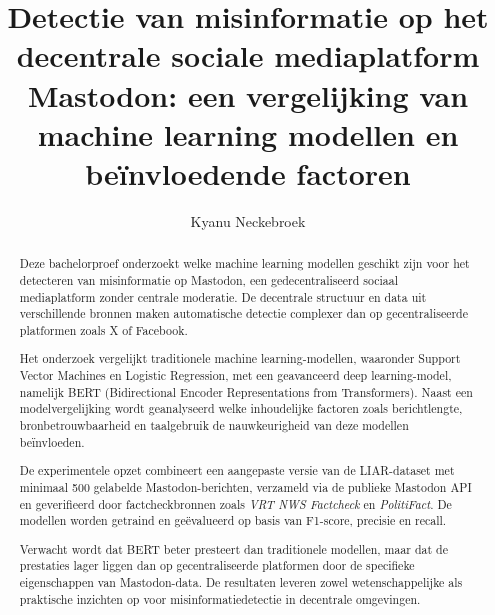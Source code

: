 \documentclass{hogent-article}
\title{Detectie van misinformatie op het decentrale sociale mediaplatform Mastodon: een vergelijking van machine learning modellen en beïnvloedende factoren}
\author{Kyanu Neckebroek}
\begin{document}
\begin{abstract}
Deze bachelorproef onderzoekt welke machine learning modellen geschikt zijn voor het detecteren van misinformatie op Mastodon, 
een gedecentraliseerd sociaal mediaplatform zonder centrale moderatie. 
De decentrale structuur en data uit verschillende bronnen maken automatische detectie complexer dan op gecentraliseerde platformen zoals X of Facebook.

Het onderzoek vergelijkt traditionele machine learning-modellen, waaronder Support Vector Machines en Logistic Regression, 
met een geavanceerd deep learning-model, namelijk BERT (Bidirectional Encoder Representations from Transformers). 
Naast een modelvergelijking wordt geanalyseerd welke inhoudelijke factoren zoals berichtlengte, bronbetrouwbaarheid en taalgebruik 
de nauwkeurigheid van deze modellen beïnvloeden.

De experimentele opzet combineert een aangepaste versie van de LIAR-dataset met minimaal 500 gelabelde Mastodon-berichten, 
verzameld via de publieke Mastodon API en geverifieerd door factcheckbronnen zoals \textit{VRT NWS Factcheck} en \textit{PolitiFact}. 
De modellen worden getraind en geëvalueerd op basis van F1-score, precisie en recall.

Verwacht wordt dat BERT beter presteert dan traditionele modellen, maar dat de prestaties lager liggen dan op gecentraliseerde platformen 
door de specifieke eigenschappen van Mastodon-data. 
De resultaten leveren zowel wetenschappelijke als praktische inzichten op voor misinformatiedetectie in decentrale omgevingen.
\end{abstract}


\tableofcontents



\printbibliography[heading=bibintoc]
\end{document}
